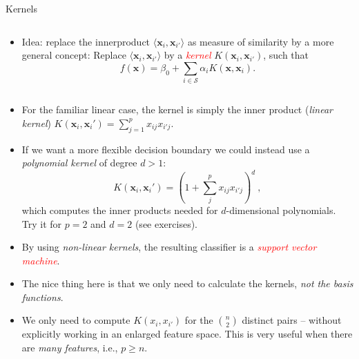 \documentclass[10pt,ignorenonframetext,]{beamer}
\providecommand{\tightlist}{%
  \setlength{\itemsep}{0pt}\setlength{\parskip}{0pt}}
\begin{document}
\begin{frame}

\begin{block}{Kernels}

\(~\)

\begin{itemize}
\tightlist
\item
  Idea: replace the innerproduct
  \(\langle {\boldsymbol x}_i, {\boldsymbol x}_{i'}\rangle\) as measure
  of similarity by a more general concept: Replace
  \(\langle {\boldsymbol x}_i, {\boldsymbol x}_{i'}\rangle\) by a
  \emph{\textcolor{red}{kernel}}
  \(K({\boldsymbol x}_i,{\boldsymbol x}_{i'})\), such that \[
  f({\boldsymbol x})=\beta_0 + \sum_{i \in \mathcal{S}} \alpha_i K({\boldsymbol x},{\boldsymbol x}_i).
  \]
\end{itemize}

\(~\)

\begin{itemize}
\tightlist
\item
  For the familiar linear case, the kernel is simply the inner product
  (\emph{linear kernel})
  \(K({\boldsymbol x}_i,{\boldsymbol x}_i')=\sum_{j=1}^p x_{ij}x_{i'j}\).
\end{itemize}

\begin{itemize}
\tightlist
\item
  If we want a more flexible decision boundary we could instead use a
  \emph{polynomial kernel} of degree \(d>1\): \[
  K({\boldsymbol x}_i,{\boldsymbol x}_i')=(1+\sum_{j}^p x_{ij} x_{i'j})^d \ , 
  \] which computes the inner products needed for \(d\)-dimensional
  polynomials. Try it for \(p=2\) and \(d=2\) (see exercises).
\end{itemize}

\end{block}

\end{frame}

\begin{frame}

\begin{itemize}
\item
  By using \emph{non-linear kernels}, the resulting classifier is a
  \emph{\textcolor{red}{support vector machine}}.
\item
  The nice thing here is that we only need to calculate the kernels,
  \emph{not the basis functions}.
\item
  We only need to compute \(K(x_i,x_{i'})\) for the \({n \choose 2}\)
  distinct pairs -- without explicitly working in an enlarged feature
  space. This is very useful when there are \emph{many features}, i.e.,
  \(p\geq n\).
\end{itemize}

\end{frame}
\end{document}
